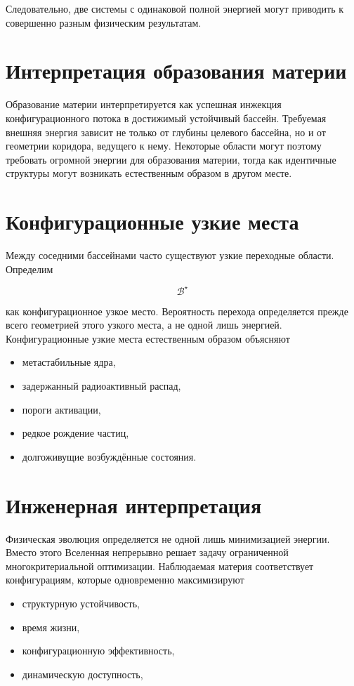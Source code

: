 Следовательно, две системы с одинаковой полной энергией могут приводить к совершенно разным физическим результатам.

\section{Интерпретация образования материи}

Образование материи интерпретируется как успешная инжекция конфигурационного потока в достижимый устойчивый бассейн. Требуемая внешняя энергия зависит не только от глубины целевого бассейна, но и от геометрии коридора, ведущего к нему. Некоторые области могут поэтому требовать огромной энергии для образования материи, тогда как идентичные структуры могут возникать естественным образом в другом месте.

\section{Конфигурационные узкие места}

Между соседними бассейнами часто существуют узкие переходные области. Определим

\[ \boxed{ \mathcal B^\star } \]

как конфигурационное узкое место. Вероятность перехода определяется прежде всего геометрией этого узкого места, а не одной лишь энергией. Конфигурационные узкие места естественным образом объясняют

\begin{itemize}
\item метастабильные ядра,
\item задержанный радиоактивный распад,
\item пороги активации,
\item редкое рождение частиц,
\item долгоживущие возбуждённые состояния.
\end{itemize}

\section{Инженерная интерпретация}

Физическая эволюция определяется не одной лишь минимизацией энергии. Вместо этого Вселенная непрерывно решает задачу ограниченной многокритериальной оптимизации. Наблюдаемая материя соответствует конфигурациям, которые одновременно максимизируют

\begin{itemize}
\item структурную устойчивость,
\item время жизни,
\item конфигурационную эффективность,
\item динамическую доступность,
\end{itemize}


